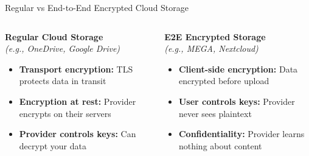 \documentclass[aspectratio=169, lualatex, handout]{beamer}
\begin{document}
\begin{frame}{Regular vs End-to-End Encrypted Cloud Storage}
	\begin{columns}
		\begin{column}{0.5\textwidth}
			\textbf{Regular Cloud Storage}\\
			\textit{(e.g., OneDrive, Google Drive)}
			\vspace{0.5cm}
			\begin{itemize}
				\item \textbf{Transport encryption:} TLS protects data in transit
				\item \textbf{Encryption at rest:} Provider encrypts on their servers
				\item \textbf{Provider controls keys:} Can decrypt your data
			\end{itemize}
		\end{column}
		\begin{column}{0.5\textwidth}
			\textbf{E2E Encrypted Storage}\\
			\textit{(e.g., MEGA, Nextcloud)}
			\vspace{0.5cm}
			\begin{itemize}
				\item \textbf{Client-side encryption:} Data encrypted before upload
				\item \textbf{User controls keys:} Provider never sees plaintext
				\item \textbf{Confidentiality:} Provider learns nothing about content
			\end{itemize}
		\end{column}
	\end{columns}
\end{frame}
\end{document}
